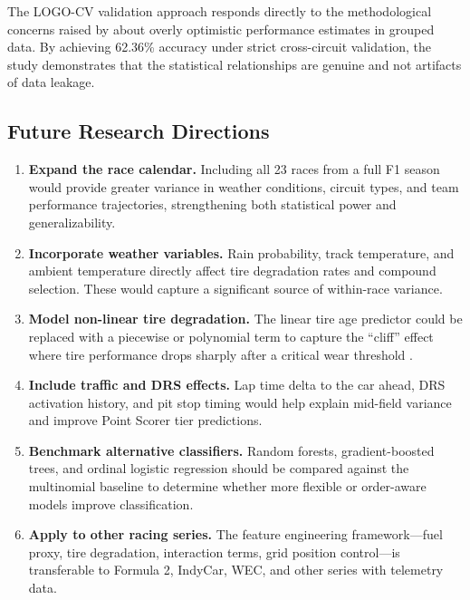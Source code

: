 The LOGO-CV validation approach responds directly to the methodological
concerns raised by \textcite{varoquaux2019} about overly optimistic
performance estimates in grouped data. By achieving 62.36\% accuracy under
strict cross-circuit validation, the study demonstrates that the statistical
relationships are genuine and not artifacts of data leakage.

\subsection{Future Research Directions}

\begin{enumerate}
  \item \textbf{Expand the race calendar.} Including all 23 races from a full
    F1 season would provide greater variance in weather conditions, circuit
    types, and team performance trajectories, strengthening both statistical
    power and generalizability.

  \item \textbf{Incorporate weather variables.} Rain probability, track
    temperature, and ambient temperature directly affect tire degradation
    rates and compound selection. These would capture a significant source of
    within-race variance.

  \item \textbf{Model non-linear tire degradation.} The linear tire age
    predictor could be replaced with a piecewise or polynomial term to
    capture the ``cliff'' effect where tire performance drops sharply after
    a critical wear threshold \parencite{baldi2022}.

  \item \textbf{Include traffic and DRS effects.} Lap time delta to the car
    ahead, DRS activation history, and pit stop timing would help explain
    mid-field variance and improve Point Scorer tier predictions.

  \item \textbf{Benchmark alternative classifiers.} Random forests,
    gradient-boosted trees, and ordinal logistic regression should be
    compared against the multinomial baseline to determine whether more
    flexible or order-aware models improve classification.

  \item \textbf{Apply to other racing series.} The feature engineering
    framework---fuel proxy, tire degradation, interaction terms, grid
    position control---is transferable to Formula 2, IndyCar, WEC, and
    other series with telemetry data.
\end{enumerate}

